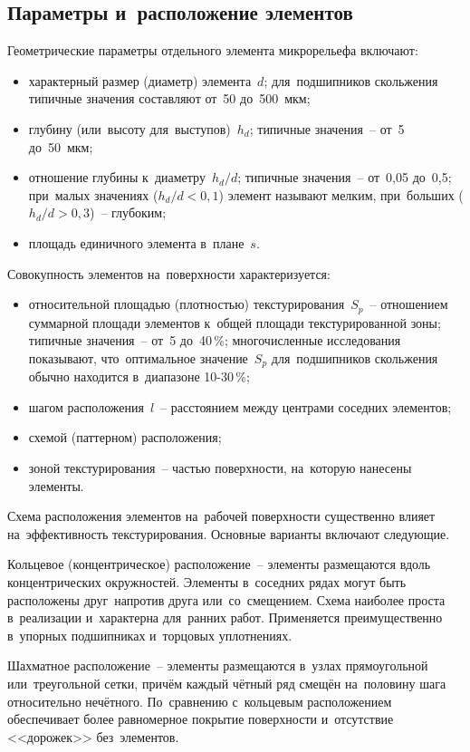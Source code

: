 \subsection{Параметры и~расположение элементов}

Геометрические параметры отдельного элемента микрорельефа включают:
\begin{itemize}
\item характерный размер (диаметр) элемента~$d$; для~подшипников скольжения типичные значения составляют от~50 до~500~мкм;
\item глубину (или~высоту для~выступов)~$h_d$; типичные значения~-- от~5 до~50~мкм;
\item отношение глубины к~диаметру~$h_d/d$; типичные значения~-- от~0{,}05 до~0{,}5; при~малых значениях ($h_d/d < 0{,}1$) элемент называют мелким, при~больших ($h_d/d > 0{,}3$)~-- глубоким;
\item площадь единичного элемента в~плане~$s$.
\end{itemize}

Совокупность элементов на~поверхности характеризуется:
\begin{itemize}
\item относительной площадью (плотностью) текстурирования~$S_p$~-- отношением суммарной площади элементов к~общей площади текстурированной зоны; типичные значения~-- от~5 до~40\,\%; многочисленные исследования показывают, что~оптимальное значение~$S_p$ для~подшипников скольжения обычно находится в~диапазоне 10-30\,\%;
\item шагом расположения~$l$~-- расстоянием между центрами соседних элементов;
\item схемой (паттерном) расположения;
\item зоной текстурирования~-- частью поверхности, на~которую нанесены элементы.
\end{itemize}

Схема расположения элементов на~рабочей поверхности существенно влияет на~эффективность текстурирования. Основные варианты включают следующие.

Кольцевое (концентрическое) расположение~-- элементы размещаются вдоль концентрических окружностей. Элементы в~соседних рядах могут быть расположены друг~напротив друга или~со~смещением. Схема наиболее проста в~реализации и~характерна для~ранних работ. Применяется преимущественно в~упорных подшипниках и~торцовых уплотнениях.

Шахматное расположение~-- элементы размещаются в~узлах прямоугольной или~треугольной сетки, причём каждый чётный ряд смещён на~половину шага относительно нечётного. По~сравнению с~кольцевым расположением обеспечивает более равномерное покрытие поверхности и~отсутствие <<дорожек>> без~элементов.

